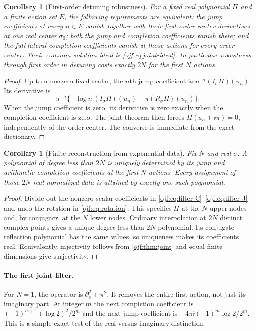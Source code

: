 \documentclass[11pt,a4paper]{article}
\numberwithin{equation}{section}
\newtheorem{corollary}[theorem]{Corollary}
\theoremstyle{definition}\newtheorem{definition}[theorem]{Definition}
\theoremstyle{remark}\newtheorem{remark}[theorem]{Remark}
\begin{document}
\begin{corollary}[First-order detuning robustness]\label{ojf:cor:robustness}
For a fixed real polynomial $\Pi$ and a finite action set $E$, the
following requirements are equivalent: the jump coefficients at every
$n\in E$ vanish together with their first order-center derivatives at
one real center $\sigma_0$; both the jump and completion coefficients
vanish there; and the full lateral completion coefficients vanish at
those actions for \emph{every} order center. Their common solution ideal
is \eqref{ojf:eq:joint-ideal}. In particular robustness through first
order in detuning costs exactly $2N$ for the first $N$ actions.
\end{corollary}
\begin{proof}
Up to a nonzero fixed scalar, the $n$th jump coefficient is
$n^{-\sigma}(I_\sigma\Pi)(u_n)$. Its derivative is
\[
 n^{-\sigma}\{-\log n\,(I_\sigma\Pi)(u_n)
                      +\pi(R_\sigma\Pi)(u_n)\}.
\]
When the jump coefficient is zero, its derivative is zero exactly when
the completion coefficient is zero. The joint theorem then forces
$\Pi(u_n\pm\ii\pi)=0$, independently of the order center. The converse
is immediate from the exact dictionary.
\end{proof}

\begin{corollary}[Finite reconstruction from exponential data]
\label{ojf:cor:reconstruction}
Fix $N$ and real $\sigma$. A polynomial of degree less than $2N$ is
uniquely determined by its jump and arithmetic-completion coefficients
at the first $N$ actions. Every assignment of those $2N$ real normalized
data is attained by exactly one such polynomial.
\end{corollary}
\begin{proof}
Divide out the nonzero scalar coefficients in
\eqref{ojf:eq:filter-C}--\eqref{ojf:eq:filter-J} and undo the rotation
in \eqref{ojf:eq:rotation}. This specifies $\Pi$ at the $N$ upper nodes
and, by conjugacy, at the $N$ lower nodes. Ordinary interpolation at
$2N$ distinct complex points gives a unique degree-less-than-$2N$
polynomial. Its conjugate-reflection polynomial has the same values,
so uniqueness makes its coefficients real. Equivalently, injectivity
follows from \cref{ojf:thm:joint} and equal finite dimensions give
surjectivity.
\end{proof}

\paragraph{The first joint filter.}
For $N=1$, the operator is $\partial_s^2+\pi^2$. It removes the
entire first action, not just its imaginary part. At integer $m$ the
next completion coefficient is
$(-1)^{m+1}(\log2)^2/2^m$ and the next jump coefficient is
$-4\pi\ii(-1)^m\log2/2^m$. This is a simple exact test of the
real-versus-imaginary distinction.
\end{document}
